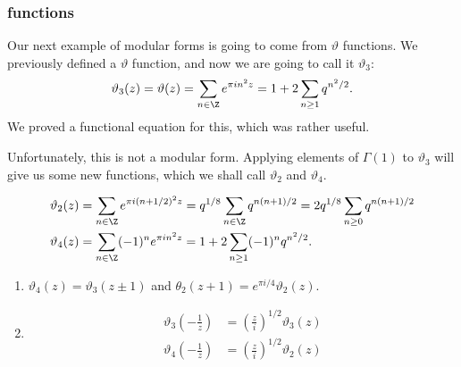 \documentclass[a4paper]{article}
\begin{document}
\subsubsection*{ functions}
Our next example of modular forms is going to come from $\vartheta$ functions. We previously defined a $\vartheta$ function, and now we are going to call it $\vartheta_3$:
\[
  \vartheta_3(z) = \vartheta(z) = \sum_{n \in \Z} e^{\pi in^2 z} = 1 + 2 \sum_{n \geq 1} q^{n^2/2}.
\]
We proved a functional equation for this, which was rather useful.

Unfortunately, this is not a modular form. Applying elements of $\Gamma(1)$ to $\vartheta_3$ will give us some new functions, which we shall call $\vartheta_2$ and $\vartheta_4$.

\begin{defi}
  \begin{align*}
    \vartheta_2(z) &= \sum_{n \in \Z} e^{\pi i (n + 1/2)^2 z} = q^{1/8} \sum_{n \in \Z} q^{n(n + 1)/2} = 2 q^{1/8} \sum_{n \geq 0} q^{n(n + 1)/2}\\
    \vartheta_4(z) &= \sum_{n \in \Z} (-1)^n e^{\pi i n^2 z} = 1 + 2 \sum_{n \geq 1} (-1)^n q^{n^2/2}.
  \end{align*}
\end{defi}

\begin{thm}\leavevmode
  \begin{enumerate}
    \item $\vartheta_4(z) = \vartheta_3(z \pm 1)$ and $\theta_2(z + 1) = e^{\pi i/4} \vartheta_2(z)$.
    \item
      \begin{align*}
        \vartheta_3\left(-\frac{1}{z}\right) &= \left(\frac{z}{i}\right)^{1/2} \vartheta_3(z)\\
        \vartheta_4 \left(-\frac{1}{z}\right) &= \left(\frac{z}{i}\right)^{1/2} \vartheta_2(z)
      \end{align*}
  \end{enumerate}
\end{thm}
\end{document}
